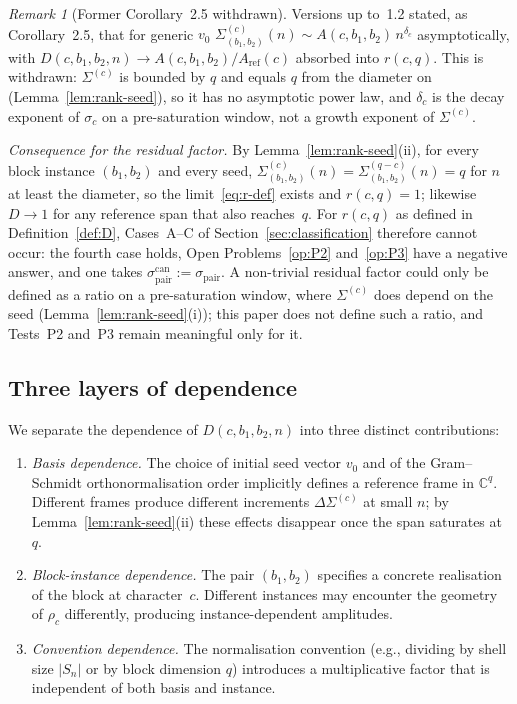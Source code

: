 \documentclass[11pt,a4paper]{article}
\theoremstyle{remark}
\newtheorem{remark}[theorem]{Remark}
\newcommand{\dc}{\delta_{c}}
\newcommand{\sigmapair}{\sigma_{\mathrm{pair}}}
\newcommand{\sigmacan}{\sigma_{\mathrm{pair}}^{\mathrm{can}}}
\newcommand{\rcq}{r(c,q)}
\begin{document}
    \begin{remark}[Former Corollary~2.5 withdrawn]
      \label{cor:D-asymptotic}
      Versions up to~1.2 stated, as Corollary~2.5, that for generic $v_0$
      $\Sigma^{(c)}_{(b_{1},b_{2})}(n) \sim A(c, b_{1}, b_{2})\, n^{\dc}$ asymptotically, with
      $D(c, b_{1}, b_{2}, n) \to A(c, b_{1}, b_{2}) / A_{\mathrm{ref}}(c)$ absorbed into $\rcq$.
      This is withdrawn: $\Sigma^{(c)}$ is bounded by $q$ and equals $q$ from the diameter on
      (Lemma~\ref{lem:rank-seed}), so it has no asymptotic power law, and $\dc$ is the decay
      exponent of $\sigma_c$ on a pre-saturation window, not a growth exponent of $\Sigma^{(c)}$.
    \end{remark}

    \noindent
    \emph{Consequence for the residual factor.}
    By Lemma~\ref{lem:rank-seed}(ii), for every block instance $(b_1,b_2)$ and every seed,
    $\Sigma^{(c)}_{(b_1,b_2)}(n) = \Sigma^{(q-c)}_{(b_1,b_2)}(n) = q$ for $n$ at least the
    diameter, so the limit~\eqref{eq:r-def} exists and $\rcq = 1$; likewise $D \to 1$ for any
    reference span that also reaches~$q$.
    For $\rcq$ as defined in Definition~\ref{def:D}, Cases~A--C of
    Section~\ref{sec:classification} therefore cannot occur: the fourth case holds, Open
    Problems~\ref{op:P2} and~\ref{op:P3} have a negative answer, and one takes $\sigmacan := \sigmapair$.
    A non-trivial residual factor could only be defined as a ratio on a pre-saturation window,
    where $\Sigma^{(c)}$ does depend on the seed (Lemma~\ref{lem:rank-seed}(i)); this paper does
    not define such a ratio, and Tests~P2 and~P3 remain meaningful only for it.

  \subsection{Three layers of dependence}

    We separate the dependence of $D(c, b_{1}, b_{2}, n)$ into three distinct
    contributions:
    \begin{enumerate}
      \item \emph{Basis dependence.}
      The choice of initial seed vector $v_{0}$ and of the Gram--Schmidt
      orthonormalisation order implicitly defines a reference frame in
      $\mathbb{C}^{q}$.
      Different frames produce different increments $\Delta\Sigma^{(c)}$ at small
      $n$; by Lemma~\ref{lem:rank-seed}(ii) these effects disappear once the span saturates at~$q$.
      \item \emph{Block-instance dependence.}
      The pair $(b_{1}, b_{2})$ specifies a concrete realisation of the block at
      character~$c$.
      Different instances may encounter the geometry of $\rho_{c}$ differently,
      producing instance-dependent amplitudes.
      \item \emph{Convention dependence.}
      The normalisation convention (e.g., dividing by shell size $|S_{n}|$ or by
      block dimension $q$) introduces a multiplicative factor that is independent
      of both basis and instance.
    \end{enumerate}
\end{document}
